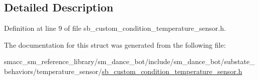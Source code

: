 \subsection{Detailed Description}


Definition at line 9 of file sb\+\_\+custom\+\_\+condition\+\_\+temperature\+\_\+sensor.\+h.



The documentation for this struct was generated from the following file\+:\begin{DoxyCompactItemize}
\item 
smacc\+\_\+sm\+\_\+reference\+\_\+library/sm\+\_\+dance\+\_\+bot/include/sm\+\_\+dance\+\_\+bot/substate\+\_\+behaviors/temperature\+\_\+sensor/\hyperlink{sb__custom__condition__temperature__sensor_8h}{sb\+\_\+custom\+\_\+condition\+\_\+temperature\+\_\+sensor.\+h}\end{DoxyCompactItemize}
